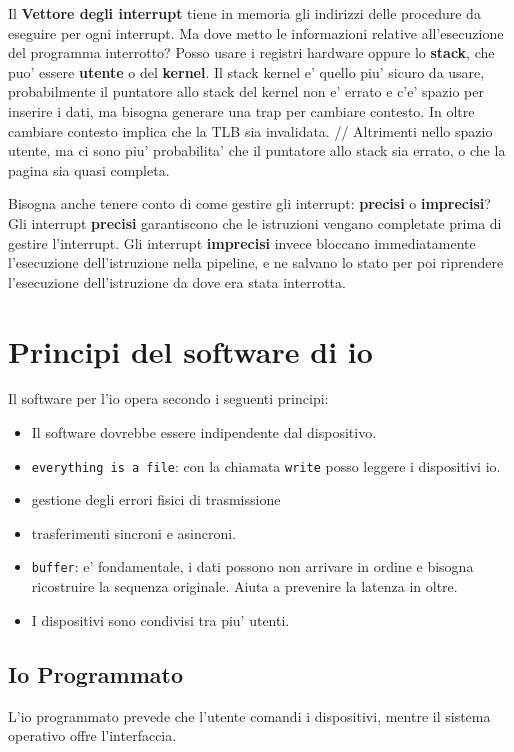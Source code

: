 Il \textbf{Vettore degli interrupt} tiene in memoria gli indirizzi delle procedure da eseguire per ogni 
interrupt.
Ma dove metto le informazioni relative all'esecuzione del programma interrotto? Posso usare
i registri hardware oppure lo \textbf{stack}, che puo' essere \textbf{utente} o del \textbf{kernel}.
Il stack kernel e' quello piu' sicuro da usare, probabilmente il puntatore allo stack del kernel 
non e' errato e c'e' spazio per inserire i dati, ma bisogna generare una trap per cambiare contesto. 
In oltre cambiare contesto implica che la TLB sia invalidata. // 
Altrimenti nello spazio utente, ma ci sono piu' probabilita' che il puntatore allo stack sia errato, o che 
la pagina sia quasi completa. 

Bisogna anche tenere conto di come gestire gli interrupt: \textbf{precisi} o \textbf{imprecisi}?
Gli interrupt \textbf{precisi} garantiscono che le istruzioni vengano completate prima di gestire l'interrupt.
Gli interrupt \textbf{imprecisi} invece bloccano immediatamente l'esecuzione dell'istruzione nella pipeline, e ne
salvano lo stato per poi riprendere l'esecuzione dell'istruzione da dove era stata interrotta. 

\section {Principi del software di io}

Il software per l'io opera secondo i seguenti principi:
\begin{itemize}
    \item Il software dovrebbe essere indipendente dal dispositivo.
    \item \texttt{everything is a file}: con la chiamata \texttt{write} posso leggere
    i dispositivi io.
    \item gestione degli errori fisici di trasmissione
    \item trasferimenti sincroni e asincroni.
    \item \texttt{buffer}: e' fondamentale, i dati possono non arrivare in ordine e bisogna ricostruire la sequenza originale.
    Aiuta a prevenire la latenza in oltre.
    \item I dispositivi sono condivisi tra piu' utenti.
\end{itemize}

\subsection{Io Programmato}
L'io programmato prevede che l'utente comandi i dispositivi, mentre il sistema 
operativo offre l'interfaccia.

